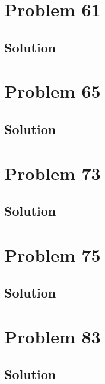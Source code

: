 \documentclass[12pt]{article}
\begin{document}
    \pagebreak
    \section{Problem 61}

        \subsection{Solution}

    \pagebreak
    \section{Problem 65}

        \subsection{Solution}

    \pagebreak
    \section{Problem 73}

        \subsection{Solution}

    \pagebreak
    \section{Problem 75}

        \subsection{Solution}

    \pagebreak
    \section{Problem 83}

        \subsection{Solution}

    \pagebreak

    \tableofcontents
    
\end{document}
